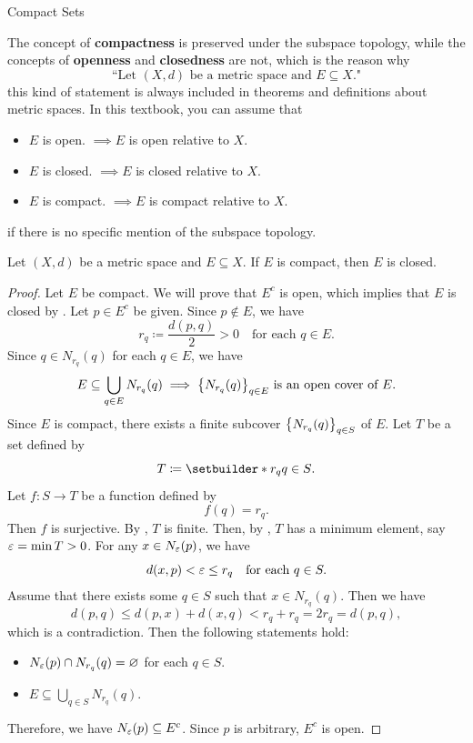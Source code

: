 \begin{section}{Compact Sets}
\begin{remark}
    The concept of \textbf{compactness} is preserved under the subspace topology, while
    the concepts of \textbf{openness} and \textbf{closedness} are not, which is the reason why
    \[
    \text{``Let $(X, d)$ be a metric space and $E \subseteq X$."}
    \]
    this kind of statement is always included in theorems and definitions about metric spaces.
    In this textbook, you can assume that
    \begin{itemize}
        \item $E$ is open. $\implies E$ is open relative to $X$.
        \item $E$ is closed. $\implies E$ is closed relative to $X$.
        \item $E$ is compact. $\implies E$ is compact relative to $X$.
    \end{itemize}
    if there is no specific mention of the subspace topology.
\end{remark}

\bigskip

\begin{theorem} \label{thm:CompactSetIsClosed}
    Let $(X, d)$ be a metric space and $E \subseteq X$. If $E$ is compact, then $E$ is closed.
\end{theorem}

\begin{proof}
    Let $E$ be compact. We will prove that $E^{c}$ is open, which implies that $E$ is closed
    by . Let $p \in E^{c}$ be given. Since $p \notin E$, we have 
    \[
    r_{q} \coloneqq \frac{d(p, q)}{2} > 0 \quad \text{for each } q \in E.
    \]
    Since $q \in N_{r_{q}}(q)$ for each $q \in E$, we have
    \[
    E \subseteq  \bigcup_{q \in E} N_{r_{q}}(q) \implies
    \set*{N_{r_{q}}(q)}_{q \in E} \text{ is an open cover of } E.
    \]
    Since $E$ is compact, there exists a finite subcover $\set*{N_{r_{q}}(q)}_{q \in S}$ of $E$.
    Let $T$ be a set defined by
    \[
    T \coloneqq \setbuilder*{r_{q}}{q \in S}.
    \]
    Let $f: S \to T$ be a function defined by
    \[
    f(q) = r_{q}.
    \]
    Then $f$ is surjective. By , $T$ is finite. Then, by
    , $T$ has a minimum element, say $\veps = \min T > 0$. 
    For any $x \in N_{\veps}(p)$, we have
    \[
    d(x, p) < \veps \leq r_{q} \quad \text{for each } q \in S.
    \]
    Assume that there exists some $q \in S$ such that $x \in N_{r_{q}}(q)$. Then we have
    \[
    d(p, q) \leq d(p, x) + d(x, q) < r_{q} + r_{q} = 2r_{q} = d(p, q),
    \]
    which is a contradiction. Then the following statements hold:
    \begin{itemize}
        \item $N_{\veps}(p) \cap N_{r_{q}}(q) = \vnot$ for each $q \in S$.
        \item $E \subseteq \displaystyle \bigcup_{q \in S} N_{r_{q}}(q)$.
    \end{itemize}
    Therefore, we have $N_{\veps}(p) \subseteq E^{c}$. Since $p$ is arbitrary, $E^{c}$ is open.
\end{proof}


\end{section}
